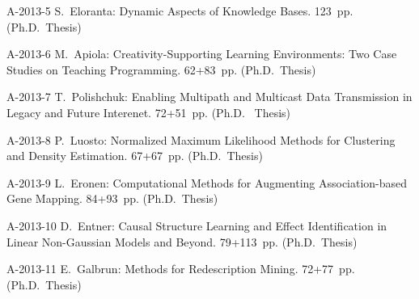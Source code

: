 \documentclass[11pt,twoside,onecolumn,final,notitlepage]{article}
\def\aloitus{\topsep0pt\partopsep0pt\itemsep0pt\parsep\parskip
\rightmargin0pt\listparindent0pt\itemindent0pt
\leftmargin14mm\labelsep1mm\labelwidth13mm
\def\makelabel##1{##1\hfill}}
\begin{document}
\begin{list}{}{\aloitus}
\item[A-2013-5] S.~Eloranta: Dynamic Aspects of Knowledge Bases. 123~pp. (Ph.D.\ Thesis)
\item[A-2013-6] M.~Apiola: Creativity-Supporting Learning Environments: Two Case Studies on Teaching Programming. 62+83~pp. (Ph.D.\ Thesis)
\item[A-2013-7] T.~Polishchuk: Enabling Multipath and Multicast Data Transmission in Legacy and Future Interenet. 72+51~pp. (Ph.D. \ Thesis)
\item[A-2013-8] P.~Luosto: Normalized Maximum Likelihood Methods for Clustering and Density Estimation. 67+67~pp. (Ph.D.\ Thesis)
\item[A-2013-9] L.~Eronen: Computational Methods for Augmenting Association-based Gene Mapping. 84+93~pp. (Ph.D.\ Thesis)
\item[A-2013-10] D.~Entner: Causal Structure Learning and Effect Identification in Linear Non-Gaussian Models and Beyond. 79+113~pp. (Ph.D.\ Thesis)
\item[A-2013-11] E.~Galbrun: Methods for Redescription Mining. 72+77~pp. (Ph.D.\ Thesis)
\end{list}
\end{document}
